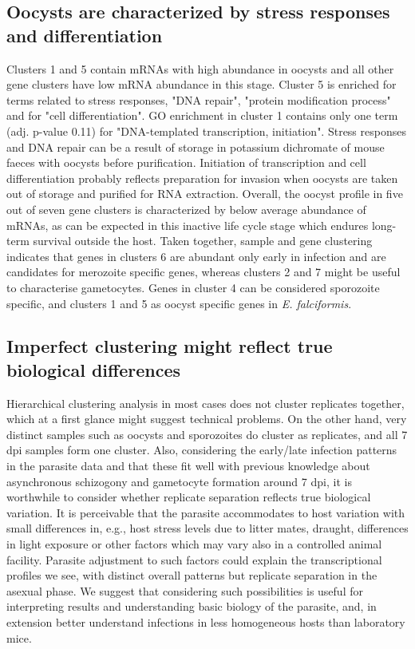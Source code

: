 \documentclass{bmcart}
\begin{document}
\subsection*{Oocysts are characterized by stress responses and differentiation}
Clusters 1 and 5 contain mRNAs with high abundance in oocysts and all other gene clusters have low mRNA abundance in this stage. Cluster 5 is enriched for terms related to stress responses, "DNA repair", "protein modification process" and for "cell differentiation". GO enrichment in cluster 1 contains only one term (adj. p-value 0.11) for "DNA-templated transcription, initiation". Stress responses and DNA repair can be a result of storage in potassium dichromate of mouse faeces with oocysts before purification. Initiation of transcription and cell differentiation probably reflects preparation for invasion when oocysts are taken out of storage and purified for RNA extraction. Overall, the oocyst profile in five out of seven gene clusters is characterized by below average abundance of mRNAs, as can be expected in this inactive life cycle stage which endures long-term survival outside the host. Taken together, sample and gene clustering indicates that genes in clusters 6 are abundant only early in infection and are candidates for merozoite specific genes, whereas clusters 2 and 7 might be useful to characterise gametocytes. Genes in cluster 4 can be considered sporozoite specific, and clusters 1 and 5 as oocyst specific genes in \textit{E. falciformis}.

\subsection*{Imperfect clustering might reflect true biological differences}
Hierarchical clustering analysis in most cases does not cluster replicates together, which at a first glance might suggest technical problems. On the other hand, very distinct samples such as oocysts and sporozoites do cluster as replicates, and all 7 dpi samples form one cluster. Also, considering the early/late infection patterns in the parasite data and that these fit well with previous knowledge about asynchronous schizogony and gametocyte formation around 7 dpi, it is worthwhile to consider whether replicate separation reflects true biological variation. It is perceivable that the parasite accommodates to host variation with small differences in, e.g., host stress levels due to litter mates, draught, differences in light exposure or other factors which may vary also in a controlled animal facility. Parasite adjustment to such factors could explain the transcriptional profiles we see, with distinct overall patterns but replicate separation in the asexual phase. We suggest that considering such possibilities is useful for interpreting results and understanding basic biology of the parasite, and, in extension better understand infections in less homogeneous hosts than laboratory mice. 
\end{document}
